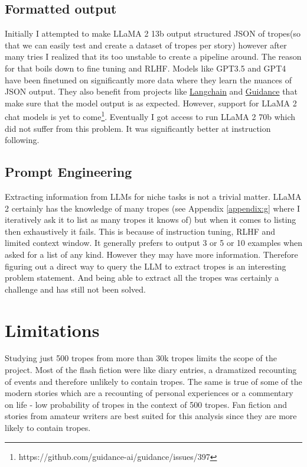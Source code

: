 \documentclass[11pt]{article}
\begin{document}
\subsection{Formatted output} \label{formattedoutput}
Initially I attempted to make LLaMA 2 13b output structured JSON of tropes(so that we can easily test and create a dataset of tropes per story) however after many tries I realized that its too unstable to create a pipeline around. The reason for that boils down to fine tuning and RLHF. Models like GPT3.5 and GPT4 have been finetuned on significantly more data where they learn the nuances of JSON output. They also benefit from projects like \href{https://github.com/langchain-ai/langchain}{Langchain} and \href{https://github.com/guidance-ai/guidance}{Guidance} that make sure that the model output is as expected. However, support for LLaMA 2 chat models is yet to come\footnote[1]{https://github.com/guidance-ai/guidance/issues/397\label{issue}}. Eventually I got access to run LLaMA 2 70b which did not suffer from this problem. It was significantly better at instruction following.

\subsection{Prompt Engineering}
Extracting information from LLMs for niche tasks is not a trivial matter. LLaMA 2 certainly has the knowledge of many tropes (see Appendix \ref{appendix:g} where I iteratively ask it to list as many tropes it knows of) but when it comes to listing then exhaustively it fails. This is because of instruction tuning, RLHF and limited context window. It generally prefers to output 3 or 5 or 10 examples when asked for a list of any kind. However they may have more information. Therefore figuring out a direct way to query the LLM to extract tropes is an interesting problem statement. And being able to extract all the tropes was certainly a challenge and has still not been solved. 

\section{Limitations} \label{discussion}
Studying just 500 tropes from more than 30k tropes limits the scope of the project. Most of the flash fiction were like diary entries, a dramatized recounting of events and therefore unlikely to contain tropes.
The same is true of some of the modern stories which are a recounting of personal experiences or a commentary on life - low probability of tropes in the context of 500 tropes. Fan fiction and stories from amateur writers are best suited for this analysis since they are more likely to contain tropes.
\end{document}
